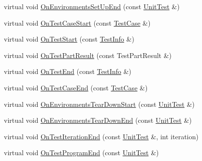 \begin{DoxyCompactItemize}
\item 
virtual void \mbox{\hyperlink{classtesting_1_1internal_1_1_event_recording_listener_a40b4c5e05abd1aa11a030f999f6adb8f}{On\+Environments\+Set\+Up\+End}} (const \mbox{\hyperlink{classtesting_1_1_unit_test}{Unit\+Test}} \&)
\item 
virtual void \mbox{\hyperlink{classtesting_1_1internal_1_1_event_recording_listener_a18c28e1d1c3a1e74e225966456786f8e}{On\+Test\+Case\+Start}} (const \mbox{\hyperlink{classtesting_1_1_test_case}{Test\+Case}} \&)
\item 
virtual void \mbox{\hyperlink{classtesting_1_1internal_1_1_event_recording_listener_aebd488b780fc172d6058ca07ca8f7145}{On\+Test\+Start}} (const \mbox{\hyperlink{classtesting_1_1_test_info}{Test\+Info}} \&)
\item 
virtual void \mbox{\hyperlink{classtesting_1_1internal_1_1_event_recording_listener_a4a6685d894923f1691ad9c6a4311470e}{On\+Test\+Part\+Result}} (const Test\+Part\+Result \&)
\item 
virtual void \mbox{\hyperlink{classtesting_1_1internal_1_1_event_recording_listener_adb076f145cc20d9b27441b9c75da4b81}{On\+Test\+End}} (const \mbox{\hyperlink{classtesting_1_1_test_info}{Test\+Info}} \&)
\item 
virtual void \mbox{\hyperlink{classtesting_1_1internal_1_1_event_recording_listener_a4d0cb8a389c7339bce0aa6128291529f}{On\+Test\+Case\+End}} (const \mbox{\hyperlink{classtesting_1_1_test_case}{Test\+Case}} \&)
\item 
virtual void \mbox{\hyperlink{classtesting_1_1internal_1_1_event_recording_listener_a17eebd7bb5cc6bab53b20794919ca5ae}{On\+Environments\+Tear\+Down\+Start}} (const \mbox{\hyperlink{classtesting_1_1_unit_test}{Unit\+Test}} \&)
\item 
virtual void \mbox{\hyperlink{classtesting_1_1internal_1_1_event_recording_listener_acd5a3dc070265166a7da68222031fd61}{On\+Environments\+Tear\+Down\+End}} (const \mbox{\hyperlink{classtesting_1_1_unit_test}{Unit\+Test}} \&)
\item 
virtual void \mbox{\hyperlink{classtesting_1_1internal_1_1_event_recording_listener_ab0cc007bcfaf06cd383d574c88f62aea}{On\+Test\+Iteration\+End}} (const \mbox{\hyperlink{classtesting_1_1_unit_test}{Unit\+Test}} \&, int iteration)
\item 
virtual void \mbox{\hyperlink{classtesting_1_1internal_1_1_event_recording_listener_a21fe9c3c519c4599a48b16ddfb734aa3}{On\+Test\+Program\+End}} (const \mbox{\hyperlink{classtesting_1_1_unit_test}{Unit\+Test}} \&)
\end{DoxyCompactItemize}
